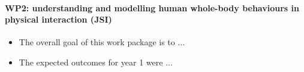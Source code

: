 \paragraph{WP2: understanding and modelling human whole-body behaviours in physical interaction (JSI)}

\begin{itemize}
\item The overall goal of this work package is to $\dots$

\item The expected outcomes for year 1 were $\dots$  
\end{itemize}